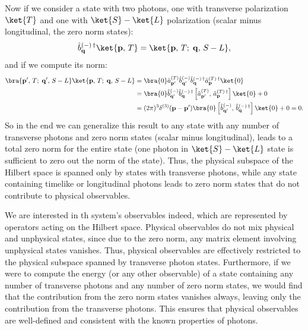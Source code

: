 Now if we consider a state with two photons, one with transverse polarization \(\ket{T}\) and one with \(\ket{S}-\ket{L}\) polarization (scalar minus longitudinal, the zero norm states):
\[
    \hat{b}^{(-)\,\dagger}_{\mathbf{q}} \ket{\mathbf{p} ,\,T}                                                          = \ket{\mathbf{p},\,T;\; \mathbf{q},\,S-L},
\]
and if we compute its norm:
\[
    \begin{aligned}
        \bra{\mathbf{p^{\prime} },\,T;\; \mathbf{q^{\prime} },\,S-L}\ket{\mathbf{p},\,T;\; \mathbf{q},\,S-L} & = \bra{0} \hat{a}^{(T)}_{\mathbf{p^{\prime}}} \hat{b}^{(-)}_{\mathbf{q^{\prime}}} \hat{b}^{(-)\,\dagger}_{\mathbf{q}} \hat{a}^{(T)\,\dagger}_{\mathbf{p}} \ket{0}                      \\
                                                                                                             & = \bra{0} \hat{b}^{(-)}_{\mathbf{q^{\prime}}}\hat{b}^{(-)\,\dagger}_{\mathbf{q}}\left[ \hat{a}^{(T)}_{\mathbf{p^{\prime}}} ,\, \hat{a}^{(T)\,\dagger}_{\mathbf{p}} \right] \ket{0} + 0 \\
                                                                                                             & = (2\pi)^3 \delta^{(3)}(\mathbf{p} - \mathbf{p^{\prime}}) \bra{0} \left[ \hat{b}^{(-)}_{\mathbf{q^{\prime}}} ,\, \hat{b}^{(-)\,\dagger}_{\mathbf{q}} \right] \ket{0} + 0 = 0.          \\
    \end{aligned}
\]
So in the end we can generalize this result to any state with any number of transverse photons and zero norm states (scalar minus longitudinal), leads to a total zero norm for the entire state (one photon in \(\ket{S}-\ket{L}\) state is sufficient to zero out the norm of the state). Thus, the physical subspace of the Hilbert space is spanned only by states with transverse photons, while any state containing timelike or longitudinal photons leads to zero norm states that do not contribute to physical observables.

We are interested in th system's observables indeed, which are represented by operators acting on the Hilbert space. Physical observables do not mix physical and unphysical states, since due to the zero norm, any matrix element involving unphysical states vanishes. Thus, physical observables are effectively restricted to the physical subspace spanned by transverse photon states. Furthermore, if we were to compute the energy (or any other observable) of a state containing any number of transverse photons and any number of zero norm states, we would find that the contribution from the zero norm states vanishes always, leaving only the contribution from the transverse photons. This ensures that physical observables are well-defined and consistent with the known properties of photons.

